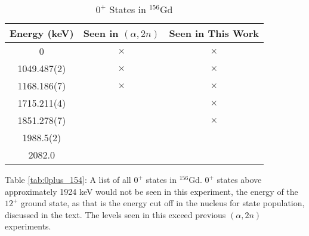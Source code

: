 \begin{table}[]
    \centering
    \begin{threeparttable}
    \centering
    \caption{$0^+$ States in $^{156}$Gd}
    \label{tab:0plus_156}
    \begin{tabular}{c|c|c}
        Energy (keV) &  Seen in $(\alpha,2n)$ & Seen in This Work  \\
        \toprule
        0 & $\times$ & $\times$\\
        1049.487(2) & $\times$ & $\times$\\
        1168.186(7) & $\times$ & $\times$\\
        1715.211(4) & & $\times$\\
        1851.278(7) & & $\times$\\
        1988.5(2) & & \\
        2082.0 & & \\
        \bottomrule
    \end{tabular}
    \begin{tablenotes}[para]
        Table \ref{tab:0plus_154}: A list of all $0^+$ states in $^{156}$Gd. $0^+$ states above approximately 1924 keV would not be seen in this experiment, the energy of the $12^+$ ground state, as that is the energy cut off in the nucleus for state population, discussed in the text. The levels seen in this exceed previous $(\alpha,2n)$ experiments.
    \end{tablenotes}
    \end{threeparttable}
\end{table}